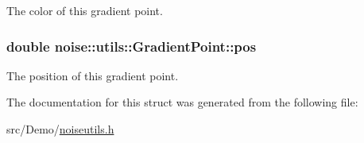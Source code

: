 The color of this gradient point. 

\hypertarget{structnoise_1_1utils_1_1_gradient_point_ab47a3602fe5727745eb01c46068511bb}{
\subsubsection[{pos}]{\setlength{\rightskip}{0pt plus 5cm}double noise\+::utils\+::\+Gradient\+Point\+::pos}}\label{structnoise_1_1utils_1_1_gradient_point_ab47a3602fe5727745eb01c46068511bb}


The position of this gradient point. 



The documentation for this struct was generated from the following file\+:\begin{DoxyCompactItemize}
\item 
src/\+Demo/\hyperlink{_demo_2noiseutils_8h}{noiseutils.\+h}\end{DoxyCompactItemize}
